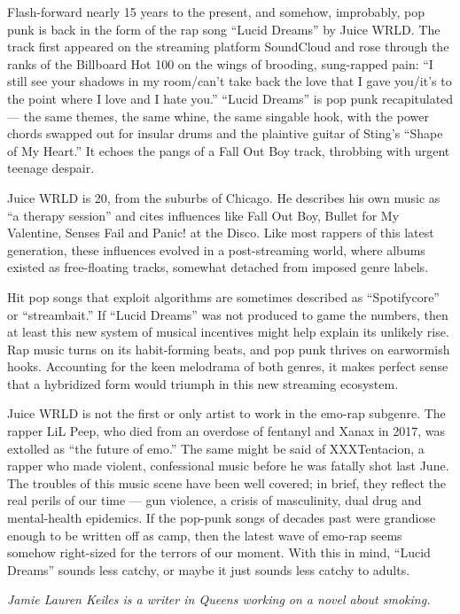 Flash-forward nearly 15 years to the present, and somehow, improbably,
pop punk is back in the form of the rap song ``Lucid Dreams'' by Juice
WRLD. The track first appeared on the streaming platform SoundCloud and
rose through the ranks of the Billboard Hot 100 on the wings of
brooding, sung-rapped pain: ``I still see your shadows in my room/can't
take back the love that I gave you/it's to the point where I love and I
hate you.'' ``Lucid Dreams'' is pop punk recapitulated --- the same
themes, the same whine, the same singable hook, with the power chords
swapped out for insular drums and the plaintive guitar of Sting's
``Shape of My Heart.'' It echoes the pangs of a Fall Out Boy track,
throbbing with urgent teenage despair.

Juice WRLD is 20, from the suburbs of Chicago. He describes his own
music as ``a therapy session'' and cites influences like Fall Out Boy,
Bullet for My Valentine, Senses Fail and Panic! at the Disco. Like most
rappers of this latest generation, these influences evolved in a
post-streaming world, where albums existed as free-floating tracks,
somewhat detached from imposed genre labels.

Hit pop songs that exploit algorithms are sometimes described as
``Spotifycore'' or ``streambait.'' If ``Lucid Dreams'' was not produced
to game the numbers, then at least this new system of musical incentives
might help explain its unlikely rise. Rap music turns on its
habit-forming beats, and pop punk thrives on earwormish hooks.
Accounting for the keen melodrama of both genres, it makes perfect sense
that a hybridized form would triumph in this new streaming ecosystem.

Juice WRLD is not the first or only artist to work in the emo-rap
subgenre. The rapper LiL Peep, who died from an overdose of fentanyl and
Xanax in 2017, was extolled as ``the future of emo.'' The same might be
said of XXXTentacion, a rapper who made violent, confessional music
before he was fatally shot last June. The troubles of this music scene
have been well covered; in brief, they reflect the real perils of our
time --- gun violence, a crisis of masculinity, dual drug and
mental-health epidemics. If the pop-punk songs of decades past were
grandiose enough to be written off as camp, then the latest wave of
emo-rap seems somehow right-sized for the terrors of our moment. With
this in mind, ``Lucid Dreams'' sounds less catchy, or maybe it just
sounds less catchy to adults.

\emph{Jamie Lauren Keiles is a writer in Queens working on a novel about
smoking.}

